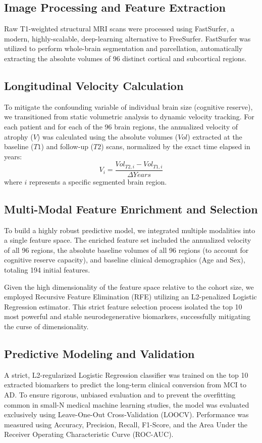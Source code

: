 \documentclass[11pt, a4paper]{article}
\begin{document}
\subsection{Image Processing and Feature Extraction}
Raw T1-weighted structural MRI scans were processed using FastSurfer, a modern, highly-scalable, deep-learning alternative to FreeSurfer. FastSurfer was utilized to perform whole-brain segmentation and parcellation, automatically extracting the absolute volumes of 96 distinct cortical and subcortical regions. 

\subsection{Longitudinal Velocity Calculation}
To mitigate the confounding variable of individual brain size (cognitive reserve), we transitioned from static volumetric analysis to dynamic velocity tracking. For each patient and for each of the 96 brain regions, the annualized velocity of atrophy ($V$) was calculated using the absolute volumes ($Vol$) extracted at the baseline ($T1$) and follow-up ($T2$) scans, normalized by the exact time elapsed in years:
\begin{equation}
V_i = \frac{Vol_{T2, i} - Vol_{T1, i}}{\Delta Years}
\end{equation}
where $i$ represents a specific segmented brain region.

\subsection{Multi-Modal Feature Enrichment and Selection}
To build a highly robust predictive model, we integrated multiple modalities into a single feature space. The enriched feature set included the annualized velocity of all 96 regions, the absolute baseline volumes of all 96 regions (to account for cognitive reserve capacity), and baseline clinical demographics (Age and Sex), totaling 194 initial features.

Given the high dimensionality of the feature space relative to the cohort size, we employed Recursive Feature Elimination (RFE) utilizing an L2-penalized Logistic Regression estimator. This strict feature selection process isolated the top 10 most powerful and stable neurodegenerative biomarkers, successfully mitigating the curse of dimensionality.

\subsection{Predictive Modeling and Validation}
A strict, L2-regularized Logistic Regression classifier was trained on the top 10 extracted biomarkers to predict the long-term clinical conversion from MCI to AD. To ensure rigorous, unbiased evaluation and to prevent the overfitting common in small-N medical machine learning studies, the model was evaluated exclusively using Leave-One-Out Cross-Validation (LOOCV). Performance was measured using Accuracy, Precision, Recall, F1-Score, and the Area Under the Receiver Operating Characteristic Curve (ROC-AUC).
\end{document}
